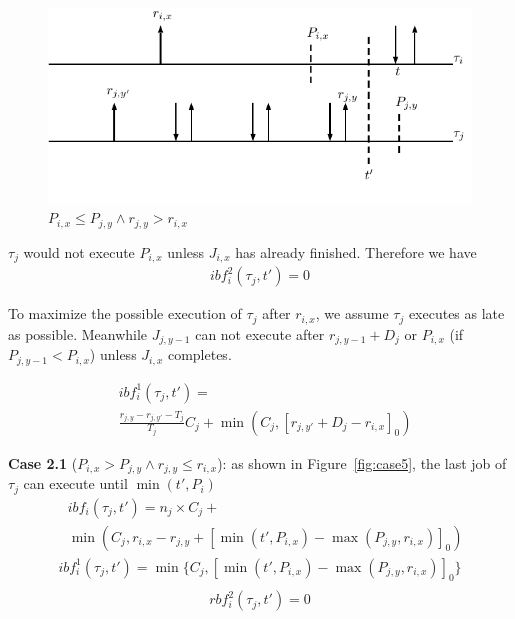 \begin{figure}[h!]
 \centering
\includegraphics[scale=0.7]{Figure/C31}  
\caption{$P_{i,x}\leq P_{j,y}\wedge r_{j,y}> r_{i,x}$}
  \label{fig:case4}
\end{figure}
$\tau_j$ would not execute $P_{i,x}$ unless $J_{i,x}$ has already finished. Therefore we have
\begin{align*}
ibf_{i}^2(\tau_j,t')=0
\end{align*}

 To maximize the possible execution of $\tau_j$ after $r_{i,x}$, we assume $\tau_j$ executes as late as possible. Meanwhile   $J_{j,y-1}$  can not execute after $r_{j,y-1}+D_j$ or $P_{i,x}$ (if $P_{j,y-1}<P_{i,x}$) unless $J_{i,x}$ completes.


\begin{align*}
&ibf_{i}^1(\tau_j,t')=\\
&\frac{r_{j,y}-r_{j,y'}-T_j}{T_j}C_j+\min(C_j,[r_{j,y'}+D_j-r_{i,x}]_0)
\end{align*}



\textbf{Case 2.1} ($P_{i,x}>P_{j,y}\wedge r_{j,y}\leq r_{i,x}$): as shown in  Figure~\ref{fig:case5}, the last job of $\tau_j$ can execute until $\min(t',P_i)$
	\begin{align*}
		&ibf_i(\tau_j,t')=n_j\times C_j+\\
		&\min\left(C_j,r_{i,x}-r_{j,y}+[\min(t',P_{i,x})-\max(P_{j,y},r_{i,x})]_0\right)
	\end{align*}
	\begin{align*}
ibf_{i}^1(\tau_j,t')=\min\{C_j,[\min(t',P_{i,x})-\max(P_{j,y},r_{i,x})]_0\}
\end{align*}
\begin{align*}
\begin{split}
rbf_{i}^2(\tau_j,t')=0
\end{split}
\end{align*}

